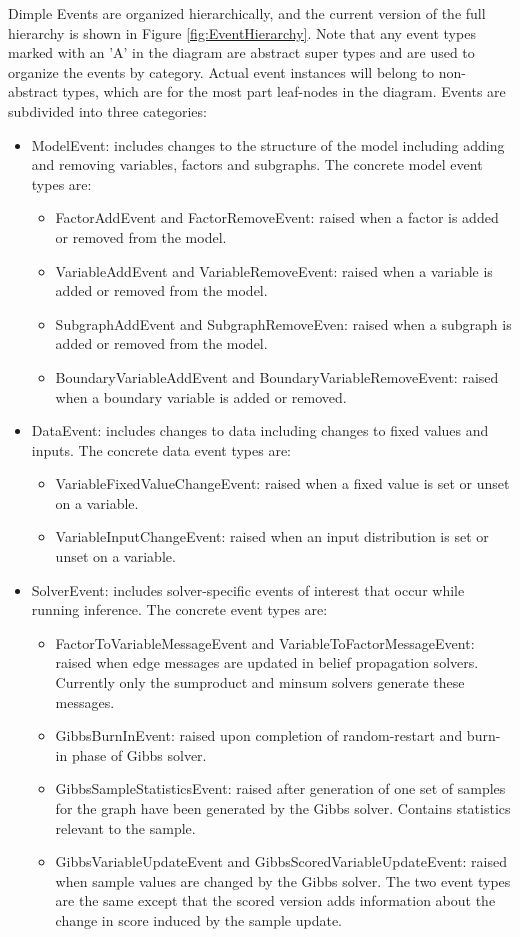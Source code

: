 Dimple Events are organized hierarchically, and the current version of the full hierarchy is shown in Figure \ref{fig:EventHierarchy}. Note that any event types marked with an 'A' in the diagram are abstract super types and are used to organize the events by category. Actual event instances will belong to non-abstract types, which are for the most part leaf-nodes in the diagram. Events are subdivided into three categories:

\begin{itemize}
\item ModelEvent: includes changes to the structure of the model including adding and removing variables, factors and subgraphs. The concrete model event types are:
  \begin{itemize}
  \item FactorAddEvent and FactorRemoveEvent: raised when a factor is added or removed from the model.
  \item VariableAddEvent and VariableRemoveEvent: raised when a variable is added or removed from the model.
  \item SubgraphAddEvent and SubgraphRemoveEven: raised when a subgraph is added or removed from the model.
  \item BoundaryVariableAddEvent and BoundaryVariableRemoveEvent: raised when a boundary variable is added or removed.
  \end{itemize}
\item DataEvent: includes changes to data including changes to fixed values and inputs. The concrete data event types are:
  \begin{itemize}
  \item VariableFixedValueChangeEvent: raised when a fixed value is set or unset on a variable.
  \item VariableInputChangeEvent: raised when an input distribution is set or unset on a variable.
  \end{itemize}
\item SolverEvent: includes solver-specific events of interest that occur while running inference. The concrete event types are:
  \begin{itemize}
  \item FactorToVariableMessageEvent and VariableToFactorMessageEvent: raised when edge messages are updated in belief propagation solvers. Currently only the sumproduct and minsum solvers generate these messages.
  \item GibbsBurnInEvent: raised upon completion of random-restart and burn-in phase of Gibbs solver.
  \item GibbsSampleStatisticsEvent: raised after generation of one set of samples for the graph have been generated by the Gibbs solver. Contains statistics relevant to the sample.
  \item GibbsVariableUpdateEvent and GibbsScoredVariableUpdateEvent: raised when sample values are changed by the Gibbs solver. The two event types are the same except that the scored version adds information about the change in score induced by the sample update.
  \end{itemize}
\end{itemize}

